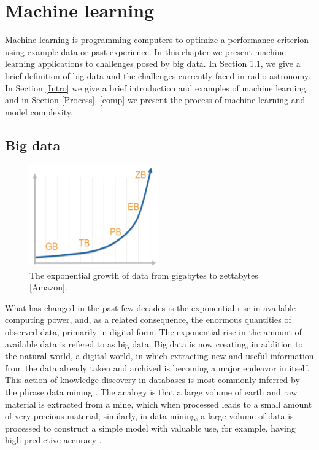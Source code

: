 
\chapter{Machine learning}
Machine learning is programming computers to optimize a performance
criterion using example data or past experience. In this chapter we present machine learning applications to challenges posed by big data. In Section \ref{BigD}, we give a brief definition of big data  and the challenges currently faced in radio astronomy. In Section \ref{Intro} we give a brief introduction and examples of machine learning,  and in Section \ref{Process}, \ref{comp} we  present the process of machine learning and model complexity.
\section{Big data}
\label{BigD}
\begin{figure}[H]
  \centering
    \includegraphics[width=0.5\textwidth]{images/Expgrowth.png}
    \caption{The exponential growth of data from gigabytes to zettabytes [Amazon].}
  \label{datagrowth.png}
\end{figure}
What has changed in the past few decades is the exponential rise in
available computing power, and, as a related consequence, the enormous quantities of observed data, primarily in digital form. The exponential rise in the amount of available data is refered to as big data. Big data is now creating, in addition to the natural world, a digital world, in which extracting new and useful information from the data already taken and archived is becoming a major endeavor in itself. This action of knowledge discovery in databases is most commonly inferred by the phrase data mining \citep{ball2010data}. The analogy is that a large volume of earth and raw material is extracted from a mine, which when processed leads to a small
amount of very precious material; similarly, in data mining, a large volume
of data is processed to construct a simple model with valuable use, for example, having high predictive accuracy \citep{alpaydin2014introduction}.

